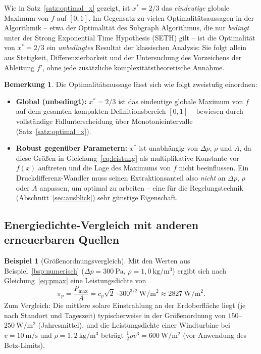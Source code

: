 ﻿\documentclass[a4paper,12pt]{article}
\theoremstyle{definition}
\newtheorem{beispiel}{Beispiel}
\newtheorem{bemerkung}{Bemerkung}
\begin{document}
Wie in Satz~\ref{satz:optimal_x} gezeigt, ist $x^\ast = 2/3$ das
\emph{eindeutige} globale Maximum von $f$ auf $[0,1]$. Im Gegensatz zu
vielen Optimalitätsaussagen in der Algorithmik -- etwa der Optimalität des
Subgraph Algorithmus, die nur \emph{bedingt} unter der Strong Exponential
Time Hypothesis (SETH) gilt -- ist die Optimalität von $x^\ast = 2/3$ ein
\emph{unbedingtes} Resultat der klassischen Analysis: Sie folgt allein aus
Stetigkeit, Differenzierbarkeit und der Untersuchung des Vorzeichens der
Ableitung $f'$, ohne jede zusätzliche komplexitätstheoretische Annahme.

\begin{bemerkung}
	Die Optimalitätsaussage lässt sich wie folgt zweistufig einordnen:
	\begin{itemize}
		\item \textbf{Global (unbedingt):} $x^\ast = 2/3$ ist das
		eindeutige globale Maximum von $f$ auf dem gesamten kompakten
		Definitionsbereich $[0,1]$ -- bewiesen durch vollständige
		Fallunterscheidung über Monotonieintervalle
		(Satz~\ref{satz:optimal_x}).
		\item \textbf{Robust gegenüber Parametern:} $x^\ast$ ist
		unabhängig von $\Delta p$, $\rho$ und $A$, da diese Größen in
		Gleichung~\eqref{eq:leistung} als multiplikative Konstante vor
		$f(x)$ auftreten und die Lage des Maximums von $f$ nicht
		beeinflussen. Ein Druckdifferenz-Wandler muss seinen
		Extraktionsanteil also \emph{nicht} an $\Delta p$, $\rho$ oder
		$A$ anpassen, um optimal zu arbeiten -- eine für die
		Regelungstechnik (Abschnitt~\ref{sec:ausblick}) sehr günstige
		Eigenschaft.
	\end{itemize}
\end{bemerkung}

\subsection{Energiedichte-Vergleich mit anderen erneuerbaren Quellen}

\begin{beispiel}[Größenordnungsvergleich]
	\label{bsp:vergleich}
	Mit den Werten aus Beispiel~\ref{bsp:numerisch} ($\Delta p = 300\
	\mathrm{Pa}$, $\rho = 1{,}0\ \mathrm{kg/m^3}$) ergibt sich nach
	Gleichung~\eqref{eq:pmax} eine Leistungsdichte von
	\[
		\pi_p = \frac{P_{\max}}{A}
		= c_p \sqrt{2}\cdot 300^{3/2}\ \mathrm{W/m^2}
		\approx 2827\ \mathrm{W/m^2}.
	\]
	Zum Vergleich: Die mittlere solare Einstrahlung an der
	Erdoberfläche liegt (je nach Standort und Tageszeit) typischerweise
	in der Größenordnung von $150$--$250\ \mathrm{W/m^2}$ (Jahresmittel),
	und die Leistungsdichte einer Windturbine bei $v = 10\ \mathrm{m/s}$
	und $\rho = 1{,}2\ \mathrm{kg/m^3}$ beträgt
	$\tfrac{1}{2}\rho v^3 = 600\ \mathrm{W/m^2}$ (vor Anwendung des
	Betz-Limits).
\end{beispiel}
\end{document}
